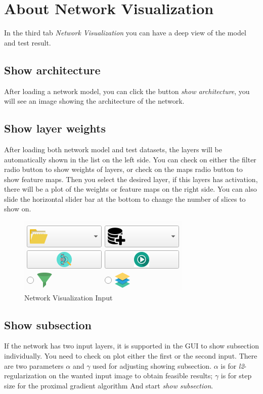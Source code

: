 \documentclass[12pt]{article}
\begin{document}
\graphicspath{ {images/} }
\section*{About Network Visualization}

In the third tab \textit{Network Visualization} you can have a deep view of the model and test result.

\subsection{Show architecture}
After loading a network model, you can click the button \textit{show architecture}, you will see an image showing the architecture of the network. 

\subsection{Show layer weights}
After loading both network model and test datasets, the layers will be automatically shown in the list on the left side. You can check on either the filter radio button to show weights of layers, or check on the maps radio button to show feature maps. Then you select the desired layer, if this layers has activation, there will be a plot of the weights or feature maps on the right side. You can also slide the horizontal slider bar at the bottom to change the number of slices to show on.
\begin{figure}[htbp]	
	\centering
	\includegraphics{visualization_in.png}
	\caption[Network Visualization Input]{Network Visualization Input}
	\label{fig:visualization_in}
\end{figure}

\subsection{Show subsection}
If the network has two input layers, it is supported in the GUI to show subsection individually. You need to check on plot either the first or the second input. There are two parameters $\alpha$ and $\gamma$ used for adjusting showing subsection. $\alpha$ is for \textit{l2}-regularization on the wanted input image to obtain feasible results; $\gamma$ is for step size for the proximal gradient algorithm  And start \textit{show subsection}.
\end{document}
